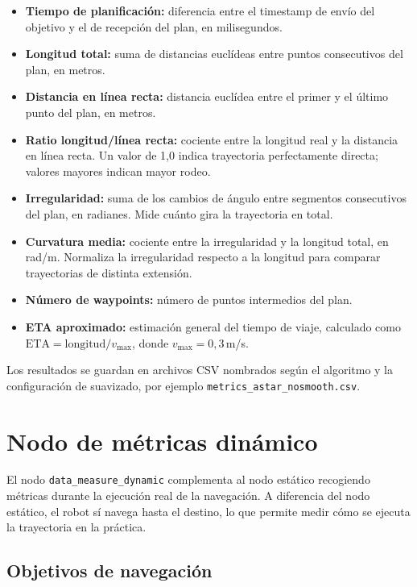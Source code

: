 \begin{itemize}
    \item \textbf{Tiempo de planificación:} diferencia entre el timestamp de envío del objetivo y el de recepción del plan, en milisegundos.
    \item \textbf{Longitud total:} suma de distancias euclídeas entre puntos consecutivos del plan, en metros.
    \item \textbf{Distancia en línea recta:} distancia euclídea entre el primer y el último punto del plan, en metros.
    \item \textbf{Ratio longitud/línea recta:} cociente entre la longitud real y la distancia en línea recta. Un valor de 1,0 indica trayectoria perfectamente directa; valores mayores indican mayor rodeo.
    \item \textbf{Irregularidad:} suma de los cambios de ángulo entre segmentos consecutivos del plan, en radianes. Mide cuánto gira la trayectoria en total.
    \item \textbf{Curvatura media:} cociente entre la irregularidad y la longitud total, en rad/m. Normaliza la irregularidad respecto a la longitud para comparar trayectorias de distinta extensión.
    \item \textbf{Número de waypoints:} número de puntos intermedios del plan.
    \item \textbf{ETA aproximado:} estimación general del tiempo de viaje, calculado como $\text{ETA} = \text{longitud} / v_{\max}$, donde $v_{\max} = 0{,}3$\,m/s.
\end{itemize}

Los resultados se guardan en archivos CSV nombrados según el algoritmo y la configuración de suavizado, por ejemplo \texttt{metrics\_astar\_nosmooth.csv}.

\section{Nodo de métricas dinámico}

El nodo \texttt{data\_measure\_dynamic} complementa al nodo estático recogiendo métricas durante la ejecución real de la navegación. A diferencia del nodo estático, el robot sí navega hasta el destino, lo que permite medir cómo se ejecuta la trayectoria en la práctica.

\subsection{Objetivos de navegación}

